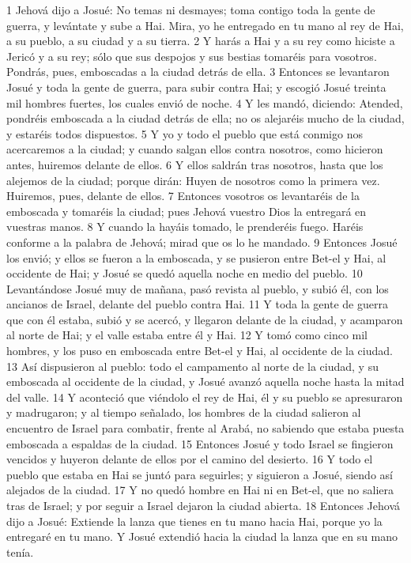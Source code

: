 1 Jehová dijo a Josué: No temas ni desmayes; toma contigo toda la gente de guerra, y levántate y sube a Hai. Mira, yo he entregado en tu mano al rey de Hai, a su pueblo, a su ciudad y a su tierra.
2 Y harás a Hai y a su rey como hiciste a Jericó y a su rey; sólo que sus despojos y sus bestias tomaréis para vosotros. Pondrás, pues, emboscadas a la ciudad detrás de ella.
3 Entonces se levantaron Josué y toda la gente de guerra, para subir contra Hai; y escogió Josué treinta mil hombres fuertes, los cuales envió de noche.
4 Y les mandó, diciendo: Atended, pondréis emboscada a la ciudad detrás de ella; no os alejaréis mucho de la ciudad, y estaréis todos dispuestos.
5 Y yo y todo el pueblo que está conmigo nos acercaremos a la ciudad; y cuando salgan ellos contra nosotros, como hicieron antes, huiremos delante de ellos.
6 Y ellos saldrán tras nosotros, hasta que los alejemos de la ciudad; porque dirán: Huyen de nosotros como la primera vez. Huiremos, pues, delante de ellos.
7 Entonces vosotros os levantaréis de la emboscada y tomaréis la ciudad; pues Jehová vuestro Dios la entregará en vuestras manos.
8 Y cuando la hayáis tomado, le prenderéis fuego. Haréis conforme a la palabra de Jehová; mirad que os lo he mandado.
9 Entonces Josué los envió; y ellos se fueron a la emboscada, y se pusieron entre Bet-el y Hai, al occidente de Hai; y Josué se quedó aquella noche en medio del pueblo.
10 Levantándose Josué muy de mañana, pasó revista al pueblo, y subió él, con los ancianos de Israel, delante del pueblo contra Hai.
11 Y toda la gente de guerra que con él estaba, subió y se acercó, y llegaron delante de la ciudad, y acamparon al norte de Hai; y el valle estaba entre él y Hai.
12 Y tomó como cinco mil hombres, y los puso en emboscada entre Bet-el y Hai, al occidente de la ciudad.
13 Así dispusieron al pueblo: todo el campamento al norte de la ciudad, y su emboscada al occidente de la ciudad, y Josué avanzó aquella noche hasta la mitad del valle.
14 Y aconteció que viéndolo el rey de Hai, él y su pueblo se apresuraron y madrugaron; y al tiempo señalado, los hombres de la ciudad salieron al encuentro de Israel para combatir, frente al Arabá, no sabiendo que estaba puesta emboscada a espaldas de la ciudad.
15 Entonces Josué y todo Israel se fingieron vencidos y huyeron delante de ellos por el camino del desierto.
16 Y todo el pueblo que estaba en Hai se juntó para seguirles; y siguieron a Josué, siendo así alejados de la ciudad. 
17 Y no quedó hombre en Hai ni en Bet-el, que no saliera tras de Israel; y por seguir a Israel dejaron la ciudad abierta.
18 Entonces Jehová dijo a Josué: Extiende la lanza que tienes en tu mano hacia Hai, porque yo la entregaré en tu mano. Y Josué extendió hacia la ciudad la lanza que en su mano tenía.

